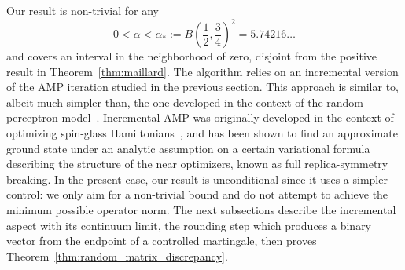 \documentclass[11pt]{article}
\theoremstyle{definition}
\theoremstyle{remark}
\numberwithin{equation}{section}
\numberwithin{theorem}{section}
\begin{document}
Our result is non-trivial for any 
\[0<\alpha<\alpha_* := B\left(\frac12,\frac34\right)^2 = 5.74216\ldots\]
and covers an interval in the neighborhood of zero,  disjoint from the positive result in Theorem~\ref{thm:maillard}.     
The algorithm relies on an incremental version of the AMP iteration studied in the previous section. This approach is similar to, albeit much simpler than, the one developed in the context of the random perceptron model~\cite{alaoui2022algorithmic,huang2026algorithmic}. Incremental AMP was originally developed in the context of optimizing spin-glass Hamiltonians~\cite{subag2018following,montanari2021optimization,ams2020}, and has been shown to find an approximate ground state under an analytic assumption on a certain variational formula describing the structure of the near optimizers, known as full replica-symmetry breaking. In the present case, our result is unconditional since it uses a simpler control: we only aim for a non-trivial bound and do not attempt to achieve the minimum possible operator norm. 
The next subsections describe the incremental aspect with its continuum limit, the rounding step which produces a binary vector from the endpoint of a controlled martingale, then proves Theorem~\ref{thm:random_matrix_discrepancy}. 



\end{document}
